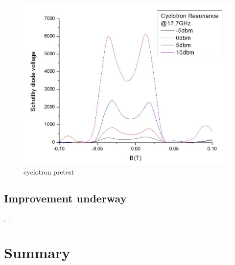 \documentclass[12pt]{ruthesis}
\begin{document}
\begin{figure}
  \centering
  \includegraphics[totalheight=8cm]{figures/CRpowerdep.JPG}
  \caption{cyclotron pretest}
  \label{crpowerdep}
\end{figure}
 







\section{Improvement underway}\label{Improvement}








\cite{Chen01APL}.
.






\chapter{Summary}\label{summary}





\appendix

%
%
%
%



\end{document}

